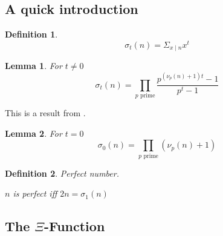\documentclass{article}
\newenvironment{pg}{

}{

\medskip

}
\newtheorem{definition}{Definition}
\newtheorem{lemma}{Lemma}[section]
\begin{document}
	\subsection{A quick introduction}
	
	\begin{pg}
		\begin{definition}
			\begin{equation*}
				σ_t(n) = Σ_{x \mid n} x^t
			\end{equation*}
		\end{definition}
		
		\begin{lemma} For $t≠0$
			\begin{equation*}
				σ_t(n) = \prod_{p \text{ prime}} \frac{p^{(ν_p(n) + 1)t} - 1}{p^t - 1}
			\end{equation*}
		\end{lemma}
		This is a result from \cite{hardy2008}.
		
		\begin{lemma} \label{lemma:6.2} For $t=0$
			\begin{equation*}
				σ_0(n) = \prod_{p \text{ prime}} (ν_p(n) + 1)
			\end{equation*}
		\end{lemma}
	\end{pg}
	
	\begin{pg}
		\begin{definition} Perfect number.
			\begin{center}
				$n$ is perfect iff $2n = σ_1(n)$
			\end{center}
		\end{definition}
	\end{pg}
	
	\subsection{The \texorpdfstring{$Ξ$}{Ξ}-Function}
	
\end{document}
